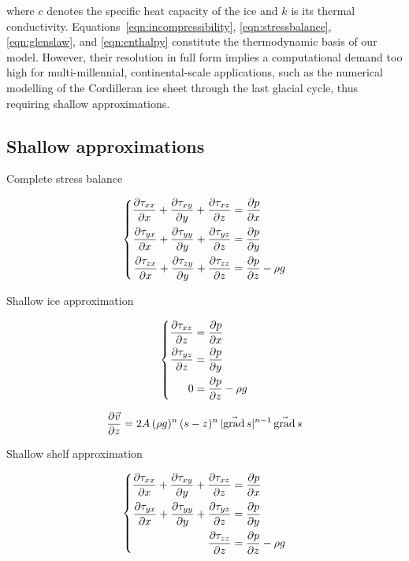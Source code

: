 \documentclass{article}
\renewcommand{\grad}[1]{\vec{\mathrm{grad}}\,#1}
\begin{document}
where $c$ denotes the specific heat capacity of the ice and $k$ is its thermal
conductivity. Equations~\ref{eqn:incompressibility}, \ref{eqn:stressbalance},
\ref{eqn:glenslaw}, and \ref{eqn:enthalpy} constitute the thermodynamic basis
of our model. However, their resolution in full form implies a computational
demand too high for multi-millennial, continental-scale applications, such as
the numerical modelling of the Cordilleran ice sheet through the last glacial
cycle, thus requiring shallow approximations.

\subsection{Shallow approximations}

Complete stress balance

\begin{equation}
    \left\{\begin{aligned}
        \pdv{\tau_{xx}}{x} + \pdv{\tau_{xy}}{y} + \pdv{\tau_{xz}}{z}
            &= \pdv{p}{x} \\
        \pdv{\tau_{yx}}{x} + \pdv{\tau_{yy}}{y} + \pdv{\tau_{yz}}{z}
            &= \pdv{p}{y} \\
        \pdv{\tau_{zx}}{x} + \pdv{\tau_{zy}}{y} + \pdv{\tau_{zz}}{z}
            &= \pdv{p}{z} - \rho g
    \end{aligned}\right.
\end{equation}

Shallow ice approximation

\begin{equation}
    \left\{\begin{aligned}
        \pdv{\tau_{xz}}{z} &= \pdv{p}{x} \\
        \pdv{\tau_{yz}}{z} &= \pdv{p}{y} \\
        0 &= \pdv{p}{z} - \rho g
    \end{aligned}\right.
\end{equation}


\begin{equation}
    \pdv{\vec{v}}{z} = 2A\,(\rho g)^n\,(s-z)^n\,|\grad{s}|^{n-1}\,\grad{s}
\end{equation}

Shallow shelf approximation

\begin{equation}
    \left\{\begin{aligned}
        \pdv{\tau_{xx}}{x} + \pdv{\tau_{xy}}{y} + \pdv{\tau_{xz}}{z}
            &= \pdv{p}{x} \\
        \pdv{\tau_{yx}}{x} + \pdv{\tau_{yy}}{y} + \pdv{\tau_{yz}}{z}
            &= \pdv{p}{y} \\
        \pdv{\tau_{zz}}{z} &= \pdv{p}{z} - \rho g
    \end{aligned}\right.
\end{equation}
\end{document}
